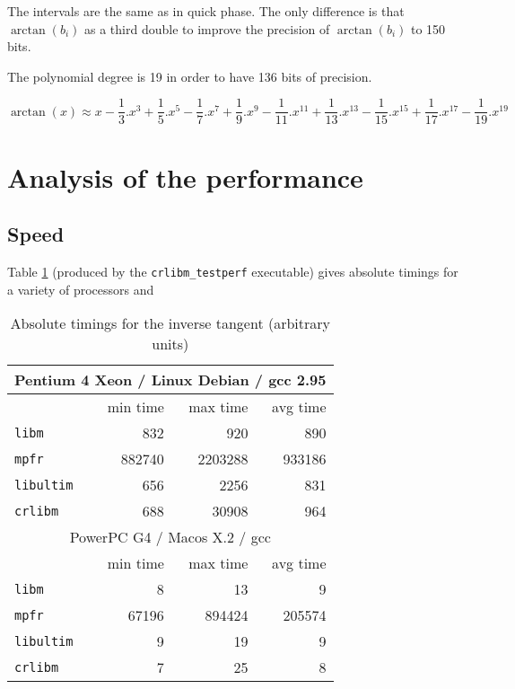 The intervals are the same as in quick phase. The only difference is that
$\arctan(b_i)$ as a third double to improve the precision of $\arctan(b_i)$ to
150 bits.

The polynomial degree is 19 in order to have 136 bits of precision.

\begin{equation} \arctan(x) \approx
x-\frac{1}{3}.x^3+\frac{1}{5}.x^5-\frac{1}{7}.x^7+\frac{1}{9}.x^9-\frac{1}{11}.x^{11}+\frac{1}{13}.x^{13}-\frac{1}{15}.x^{15}+\frac{1}{17}.x^{17}-\frac{1}{19}.x^{19}
\label{eq:arctan_scspoly}
\end{equation}

\section{Analysis of the performance}

\subsection{Speed}
Table \ref{tbl:arctan_abstime} (produced by the \texttt{crlibm\_testperf}
executable) gives absolute timings for a variety of processors and

\begin{table}[!htb]
\begin{center}
\renewcommand{\arraystretch}{1.2}
\begin{tabular}{|l|r|r|r|}
\hline
\hline

 \multicolumn{4}{|c|}{Pentium 4 Xeon / Linux Debian / gcc 2.95}   \\
 \hline
                         & min time      & max time      & avg time \\
 \hline
 \texttt{libm}           & 832          & 920           &        890 \\
 \hline
  \texttt{mpfr}          & 882740       & 2203288       &     933186 \\
 \hline
  \texttt{libultim}      & 656          & 2256          &        831 \\
 \hline
 \texttt{crlibm}         & 688          & 30908         &        964 \\
 \hline


\multicolumn{4}{|c|}{PowerPC G4 / Macos X.2 / gcc }   \\
 \hline
                         & min time      & max time      & avg time \\
 \hline
 \texttt{libm}           & 8            & 13            &          9 \\
 \hline
  \texttt{mpfr}          & 67196        & 894424        &     205574 \\
 \hline
  \texttt{libultim}      & 9            & 19            &          9 \\
 \hline
 \texttt{crlibm}         & 7            & 25            &          8 \\
 \hline

\end{tabular}
\end{center}
\caption{Absolute timings for the inverse tangent (arbitrary units)
  \label{tbl:arctan_abstime}}
\end{table}

